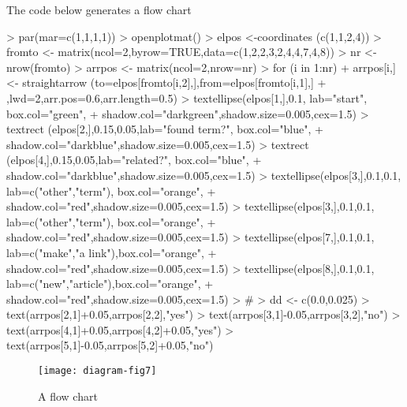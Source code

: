 \documentclass[article,nojss]{jss}
\begin{document}
The code below generates a flow chart
\begin{Schunk}
\begin{Sinput}
> par(mar=c(1,1,1,1))
> openplotmat()
> elpos  <-coordinates (c(1,1,2,4))
> fromto <- matrix(ncol=2,byrow=TRUE,data=c(1,2,2,3,2,4,4,7,4,8))
> nr     <-nrow(fromto)
> arrpos <- matrix(ncol=2,nrow=nr)
> for (i in 1:nr)
+     arrpos[i,]<- straightarrow (to=elpos[fromto[i,2],],from=elpos[fromto[i,1],]
+         ,lwd=2,arr.pos=0.6,arr.length=0.5)
> textellipse(elpos[1,],0.1,      lab="start",           box.col="green",
+             shadow.col="darkgreen",shadow.size=0.005,cex=1.5)
> textrect   (elpos[2,],0.15,0.05,lab="found term?",     box.col="blue",
+             shadow.col="darkblue",shadow.size=0.005,cex=1.5)
> textrect   (elpos[4,],0.15,0.05,lab="related?",        box.col="blue",
+             shadow.col="darkblue",shadow.size=0.005,cex=1.5)
> textellipse(elpos[3,],0.1,0.1,  lab=c("other","term"), box.col="orange",
+             shadow.col="red",shadow.size=0.005,cex=1.5)
> textellipse(elpos[3,],0.1,0.1,  lab=c("other","term"), box.col="orange",
+             shadow.col="red",shadow.size=0.005,cex=1.5)
> textellipse(elpos[7,],0.1,0.1,  lab=c("make","a link"),box.col="orange",
+             shadow.col="red",shadow.size=0.005,cex=1.5)
> textellipse(elpos[8,],0.1,0.1,  lab=c("new","article"),box.col="orange",
+             shadow.col="red",shadow.size=0.005,cex=1.5)
> #
> dd <- c(0.0,0.025)
> text(arrpos[2,1]+0.05,arrpos[2,2],"yes")
> text(arrpos[3,1]-0.05,arrpos[3,2],"no")
> text(arrpos[4,1]+0.05,arrpos[4,2]+0.05,"yes")
> text(arrpos[5,1]-0.05,arrpos[5,2]+0.05,"no")
\end{Sinput}
\end{Schunk}
\begin{figure}
\begin{center}
\texttt{[image: diagram-fig7]}
\end{center}
\caption{A flow chart}
\label{fig:seven}
\end{figure}
\end{document}
